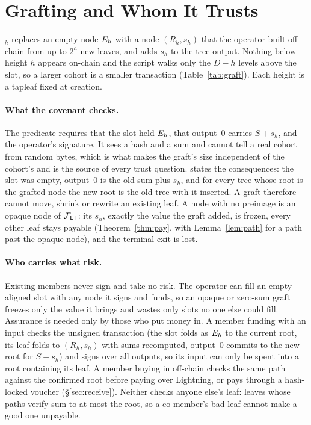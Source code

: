 \section{Grafting and Whom It Trusts}\label{sec:graft}

$_h$ replaces an empty node $E_h$ with a node $(R_h, s_h)$
that the operator built off-chain from up to $2^h$ new leaves, and adds
$s_h$ to the tree output. Nothing below height $h$ appears on-chain and
the script walks only the $D - h$ levels above the slot, so a larger
cohort is a smaller transaction (Table~\ref{tab:graft}). Each height is a
tapleaf fixed at creation.

\paragraph{What the covenant checks.} The predicate requires that the
slot held $E_h$, that output~0 carries $S + s_h$, and the operator's
signature. It sees a hash and a sum and cannot tell a real cohort from
random bytes, which is what makes the graft's size independent of the
cohort's and is the source of every trust question.  states the
consequences: the slot was empty, output~0 is the old sum plus $s_h$, and
for every tree whose root is the grafted node the new root is the old
tree with it inserted. A graft therefore cannot move, shrink or rewrite
an existing leaf. A node with no preimage is an opaque node of $\mathcal{F}_{\mathsf{LT}}$:
its $s_h$, exactly the value the graft added, is frozen, every other leaf
stays payable (Theorem~\ref{thm:pay}, with Lemma~\ref{lem:path} for a
path past the opaque node), and
the terminal exit is lost.

\paragraph{Who carries what risk.} Existing members never sign and take
no risk. The operator can fill an empty aligned slot with any node it
signs and funds, so an opaque or zero-sum graft freezes only the value it
brings and wastes only slots no one else could fill. Assurance is needed
only by those who put money in. A member funding with an input checks the
unsigned transaction (the slot folds as $E_h$ to the current root, its
leaf folds to $(R_h, s_h)$ with sums recomputed, output~0 commits to the
new root for $S + s_h$) and signs over all outputs, so its input can only
be spent into a root containing its leaf. A member buying in off-chain
checks the same path against the confirmed root before paying over
Lightning, or pays through a hash-locked voucher (\S\ref{sec:receive}).
Neither checks anyone else's leaf: leaves whose paths verify sum to at
most the root, so a co-member's bad leaf cannot make a good one unpayable.

